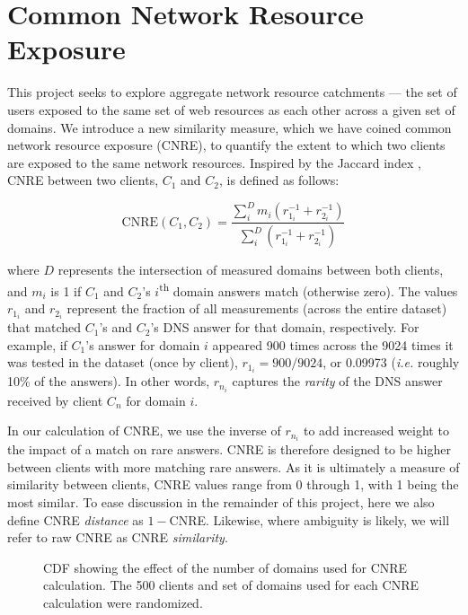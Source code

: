 \section{Common Network Resource Exposure} \label{sect:cnre}

This project seeks to explore aggregate network resource catchments --- the set of
users exposed to the same set of web resources as each other across a given set
of domains. We introduce a new similarity measure, which we have coined common
network resource exposure (CNRE), to quantify the extent to which two clients
are exposed to the same network resources. Inspired by the Jaccard index \cite{jaccard1908nouvelles},
CNRE between two clients, $C_1$ and $C_2$, is defined as follows:

\[ \textrm{CNRE}(C_1, C_2) = \frac{ \sum_{i}^D  m_{i} (r_{1_i}^{-1}+r_{2_i}^{-1})}{ \sum_{i}^D (r_{1_i}^{-1}+r_{2_i}^{-1})} \]

where $D$ represents the intersection of measured domains between both clients, 
and $m_{i}$ is 1 if $C_{1}$ and $C_{2}$'s
$i$\textsuperscript{th} domain answers match (otherwise zero). The values
$r_{1_i}$ and $r_{2_i}$ represent the fraction of all measurements (across the
entire dataset) that matched $C_1$'s and $C_2$'s DNS answer for that domain,
respectively. For example, if $C_1$'s answer for domain $i$ appeared 900 times
across the 9024 times it was tested in the dataset (once by client), 
\(r_{1_i} =  900 / 9024\), or 0.09973 (\emph{i.e.} roughly 10\% of the answers). 
In other words, $r_{n_i}$ captures the
\emph{rarity} of the DNS answer received by client $C_n$ for domain $i$.

In our calculation of CNRE, we use the inverse of $r_{n_i}$ to add increased
weight to the impact of a match on rare answers. CNRE is therefore designed
to be higher between clients with more matching rare answers. As it is
ultimately a measure of similarity between clients, CNRE values range from 0
through 1, with 1 being the most similar. To ease discussion in the remainder of
this project, here we also define CNRE \emph{distance} as \(1 - \)CNRE. Likewise, where
ambiguity is likely, we will refer to raw CNRE as CNRE \emph{similarity}. 

\begin{figure}
    \caption{CDF showing the effect of the number of domains used for CNRE
    calculation. The 500 clients and set of domains used for each CNRE
    calculation were randomized.}
    \label{fig:90cnre}
\end{figure}

